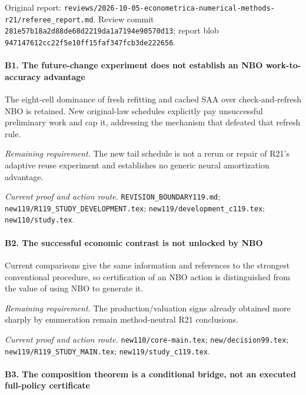 Original report: \nolinkurl{reviews/2026-10-05-econometrica-numerical-methods-r21/referee_report.md}. Review commit \nolinkurl{281e57b18a2d88de68d2219da1a7194e90570d13}; report blob \nolinkurl{947147612cc22f5e10ff15faf347fcb3de222656}.

\paragraph{B1. The future-change experiment does not establish an NBO work-to-accuracy advantage}

The eight-cell dominance of fresh refitting and cached SAA over check-and-refresh NBO is retained. New original-law schedules explicitly pay unsuccessful preliminary work and cap it, addressing the mechanism that defeated that refresh rule.

\par\emph{Remaining requirement.} The new tail schedule is not a rerun or repair of R21's adaptive reuse experiment and establishes no generic neural amortization advantage.

\par\emph{Current proof and action route.} \nolinkurl{REVISION_BOUNDARY119.md}; \nolinkurl{new119/R119_STUDY_DEVELOPMENT.tex}; \nolinkurl{new119/development_c119.tex}; \nolinkurl{new110/study.tex}.

\paragraph{B2. The successful economic contrast is not unlocked by NBO}

Current comparisons give the same information and references to the strongest conventional procedure, so certification of an NBO action is distinguished from the value of using NBO to generate it.

\par\emph{Remaining requirement.} The production/\allowbreak{}valuation signs already obtained more sharply by enumeration remain method-neutral R21 conclusions.

\par\emph{Current proof and action route.} \nolinkurl{new110/core-main.tex}; \nolinkurl{new/decision99.tex}; \nolinkurl{new119/R119_STUDY_MAIN.tex}; \nolinkurl{new119/study_c119.tex}.

\paragraph{B3. The composition theorem is a conditional bridge, not an executed full-policy certificate}

